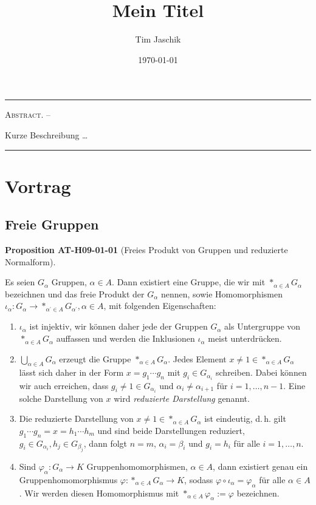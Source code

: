 \documentclass[10pt, letterpaper]{article}
\title{Mein Titel}
\author{Tim Jaschik}
\date{\today}
\renewenvironment{abstract}
  {
    \begin{adjustwidth}{1.5cm}{1.5cm}
    \small
    \textsc{Abstract. –}%
  }
  {
    \end{adjustwidth}
  }
\newcommand{\CustomHeading}[3]{%
  \par\medskip\noindent%
  \textbf{#1 #2} \textnormal{(#3)}.\enskip%
}
\newenvironment{PROP}[2]{\CustomHeading{Proposition}{#1}{#2}}{}
\begin{document}
\maketitle
\rule{\textwidth}{0.5pt}
\begin{abstract}
Kurze Beschreibung …
\end{abstract}
\rule{\textwidth}{0.5pt}
\vspace{0.5cm}

\tableofcontents

\pagebreak

\section{Vortrag}

\subsection{Freie Gruppen}

\begin{PROP}{AT-H09-01-01}{Freies Produkt von Gruppen und reduzierte Normalform}
Es seien $G_\alpha$ Gruppen, $\alpha \in A$. Dann existiert eine Gruppe, die wir mit $*_{\alpha \in A} G_\alpha$ bezeichnen und das freie Produkt der $G_\alpha$ nennen, sowie Homomorphismen $\iota_\alpha: G_\alpha \rightarrow *_{\alpha^{\prime} \in A} G_{\alpha^{\prime}}, \alpha \in A$, mit folgenden Eigenschaften:
\begin{enumerate}
  \item $\iota_\alpha$ ist injektiv, wir können daher jede der Gruppen $G_\alpha$ als Untergruppe von $*_{\alpha \in A} G_\alpha$ auffassen und werden die Inklusionen $\iota_\alpha$ meist unterdrücken.
  
  \item $\bigcup_{\alpha \in A} G_\alpha$ erzeugt die Gruppe $*_{\alpha \in A} G_\alpha$. Jedes Element $x \neq 1 \in *_{\alpha \in A} G_\alpha$ lässt sich daher in der Form $x = g_1 \cdots g_n$ mit $g_i \in G_{\alpha_i}$ schreiben. Dabei können wir auch erreichen, dass $g_i \neq 1 \in G_{\alpha_i}$ und $\alpha_i \neq \alpha_{i+1}$ für $i = 1, \ldots, n-1$. Eine solche Darstellung von $x$ wird \emph{reduzierte Darstellung} genannt.
  
  \item Die reduzierte Darstellung von $x \neq 1 \in *_{\alpha \in A} G_\alpha$ ist eindeutig, d.\,h. gilt $g_1 \cdots g_n = x = h_1 \cdots h_m$ und sind beide Darstellungen reduziert, $g_i \in G_{\alpha_i}, h_j \in G_{\beta_j}$, dann folgt $n = m$, $\alpha_i = \beta_i$ und $g_i = h_i$ für alle $i = 1, \ldots, n$.
  
  \item Sind $\varphi_\alpha: G_\alpha \rightarrow K$ Gruppenhomomorphismen, $\alpha \in A$, dann existiert genau ein Gruppenhomomorphismus $\varphi: *_{\alpha \in A} G_\alpha \rightarrow K$, sodass $\varphi \circ \iota_\alpha = \varphi_\alpha$ für alle $\alpha \in A$. Wir werden diesen Homomorphismus mit $*_{\alpha \in A} \varphi_\alpha := \varphi$ bezeichnen.
\end{enumerate}
\end{PROP}
\end{document}
